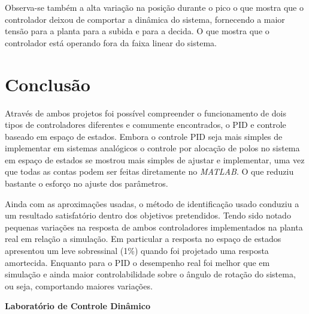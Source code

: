 \documentclass[a4paper,11pt]{article}
\begin{document}
Observa-se também a alta variação na posição durante o pico o que mostra que o controlador deixou de comportar a dinâmica do sistema, fornecendo a maior tensão para a planta para a subida e para a decida. O que mostra que o controlador está operando fora da faixa linear do sistema.


\section{Conclusão}

Através de ambos projetos foi possível compreender o funcionamento de dois tipos de controladores diferentes e comumente encontrados, o PID e controle baseado em espaço de estados. Embora o controle PID seja mais simples de implementar em sistemas analógicos o controle por alocação de polos no sistema em espaço de estados se mostrou mais simples de ajustar e implementar, uma vez que todas as contas podem ser feitas diretamente no \textit{MATLAB}. O que reduziu bastante o esforço no ajuste dos parâmetros.

Ainda com as aproximações usadas, o método de identificação usado conduziu a um resultado satisfatório dentro dos objetivos pretendidos. Tendo sido notado pequenas variações na resposta de ambos controladores implementados na planta real em relação a simulação. Em particular a resposta no espaço de estados apresentou um leve sobressinal (1\%) quando foi projetado uma resposta amortecida. Enquanto para o PID o desempenho real foi melhor que em simulação e ainda maior controlabilidade sobre o ângulo de rotação do sistema, ou seja, comportando maiores variações.





\nocite{ogata2010modern}


\newpage

\begin{center}
    \huge \textbf{Laboratório de Controle Dinâmico \\}
\end{center}
\end{document}
